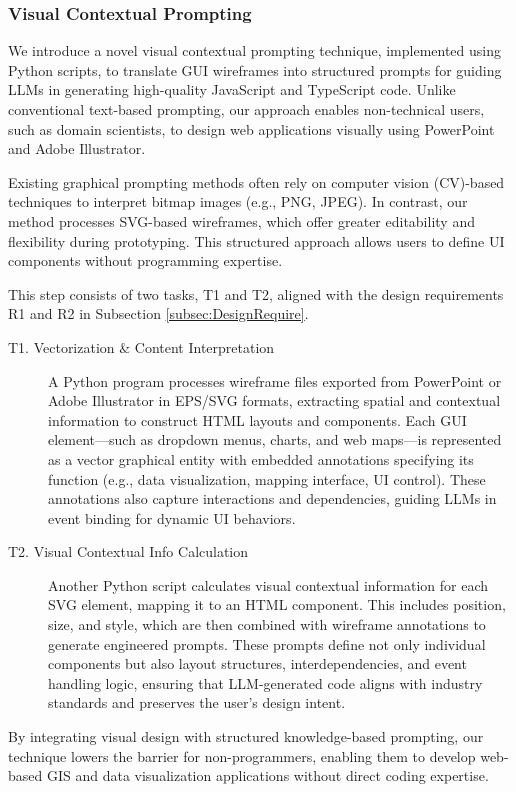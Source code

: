 \subsubsection{Visual Contextual Prompting}
\label{subsec:simulations1}
We introduce a novel visual contextual prompting technique, implemented using Python scripts, to translate GUI wireframes into structured prompts for guiding LLMs in generating high-quality JavaScript and TypeScript code. Unlike conventional text-based prompting, our approach enables non-technical users, such as domain scientists, to design web applications visually using PowerPoint and Adobe Illustrator.

Existing graphical prompting methods often rely on computer vision (CV)-based techniques to interpret bitmap images (e.g., PNG, JPEG). In contrast, our method processes SVG-based wireframes, which offer greater editability and flexibility during prototyping. This structured approach allows users to define UI components without programming expertise.

This step consists of two tasks, T1 and T2, aligned with the design requirements R1 and R2 in Subsection \ref{subsec:DesignRequire}.

\begin{description}
\item[T1. Vectorization \& Content Interpretation]
A Python program processes wireframe files exported from PowerPoint or Adobe Illustrator in EPS/SVG formats, extracting spatial and contextual information to construct HTML layouts and components. Each GUI element—such as dropdown menus, charts, and web maps—is represented as a vector graphical entity with embedded annotations specifying its function (e.g., data visualization, mapping interface, UI control). These annotations also capture interactions and dependencies, guiding LLMs in event binding for dynamic UI behaviors.

\item[T2. Visual Contextual Info Calculation]
Another Python script calculates visual contextual information for each SVG element, mapping it to an HTML component. This includes position, size, and style, which are then combined with wireframe annotations to generate engineered prompts. These prompts define not only individual components but also layout structures, interdependencies, and event handling logic, ensuring that LLM-generated code aligns with industry standards and preserves the user’s design intent.
\end{description}
By integrating visual design with structured knowledge-based prompting, our technique lowers the barrier for non-programmers, enabling them to develop web-based GIS and data visualization applications without direct coding expertise.

